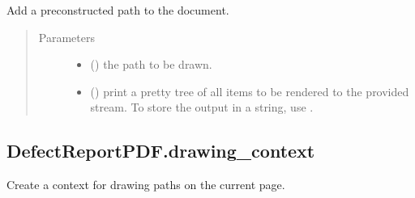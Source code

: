 \documentclass[letterpaper,10pt,english]{sphinxmanual}
\begin{document}
\begin{fulllineitems}
\begin{fulllineitems}
\label{\detokenize{generated/quality_assessment.quality_pdf_report.DefectReportPDF.draw_path:quality_assessment.quality_pdf_report.DefectReportPDF.draw_path}}
\sphinxAtStartPar
Add a pre\sphinxhyphen{}constructed path to the document.
\begin{quote}\begin{description}
\item[{Parameters}] \leavevmode\begin{itemize}
\item {} 
\sphinxAtStartPar
{} () \textendash{} the path to be drawn.

\item {} 
\sphinxAtStartPar
{} () \textendash{} print a pretty tree of all items to be rendered
to the provided stream. To store the output in a string, use
.

\end{itemize}

\end{description}\end{quote}

\end{fulllineitems}



\subsection{DefectReportPDF.drawing\_context}
\label{\detokenize{generated/quality_assessment.quality_pdf_report.DefectReportPDF.drawing_context:defectreportpdf-drawing-context}}\label{\detokenize{generated/quality_assessment.quality_pdf_report.DefectReportPDF.drawing_context::doc}}

\begin{fulllineitems}
\label{\detokenize{generated/quality_assessment.quality_pdf_report.DefectReportPDF.drawing_context:quality_assessment.quality_pdf_report.DefectReportPDF.drawing_context}}
\sphinxAtStartPar
Create a context for drawing paths on the current page.


\end{fulllineitems}
\end{fulllineitems}
\end{document}
